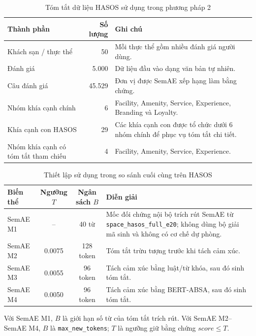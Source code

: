 \begin{table}[H]
\centering
\caption{Tóm tắt dữ liệu HASOS sử dụng trong phương pháp 2}
\label{tab:hasos-data-summary}
\begin{tabularx}{\textwidth}{L{0.28\textwidth} r Y}
\toprule
\textbf{Thành phần} & \textbf{Số lượng} & \textbf{Ghi chú} \\
\midrule
Khách sạn / thực thể & 50 & Mỗi thực thể gồm nhiều đánh giá người dùng. \\
Đánh giá & 5.000 & Dữ liệu đầu vào dạng văn bản tự nhiên. \\
Câu đánh giá & 45.529 & Đơn vị được SemAE xếp hạng làm bằng chứng. \\
Nhóm khía cạnh chính & 6 & Facility, Amenity, Service, Experience, Branding và Loyalty. \\
Khía cạnh con HASOS & 29 & Các khía cạnh con được tổ chức dưới 6 nhóm chính để phục vụ tóm tắt chi tiết. \\
Nhóm khía cạnh có tóm tắt tham chiếu & 4 & Facility, Amenity, Service, Experience. \\
\bottomrule
\end{tabularx}
\end{table}

\begin{table}[tbp]
\centering
\caption{Thiết lập sử dụng trong so sánh cuối cùng trên HASOS}
\label{tab:optimal-settings}
\begin{threeparttable}
\begin{tabularx}{\textwidth}{l c c Y}
\toprule
\textbf{Biến thể} & \textbf{Ngưỡng $T$} & \textbf{Ngân sách $B$} & \textbf{Diễn giải} \\
\midrule
SemAE M1 & -- & 40 từ & Mốc đối chứng nội bộ trích rút SemAE từ \texttt{space\_hasos\_full\_e20}; không dùng bộ giải mã sinh và không có cơ chế dự phòng. \\
SemAE M2 & 0.0075 & 128 token & Tóm tắt trừu tượng trước khi tách cảm xúc. \\
SemAE M3 & 0.0055 & 96 token & Tách cảm xúc bằng luật/từ khóa, sau đó sinh tóm tắt. \\
SemAE M4 & 0.0050 & 96 token & Tách cảm xúc bằng BERT-ABSA, sau đó sinh tóm tắt. \\
\bottomrule
\end{tabularx}
\begin{tablenotes}
\footnotesize
\item Với SemAE M1, $B$ là giới hạn số từ của tóm tắt trích rút. Với SemAE M2--SemAE M4, $B$ là \texttt{max\_new\_tokens}; $T$ là ngưỡng giữ bằng chứng $score \leq T$.
\end{tablenotes}
\end{threeparttable}
\end{table}

